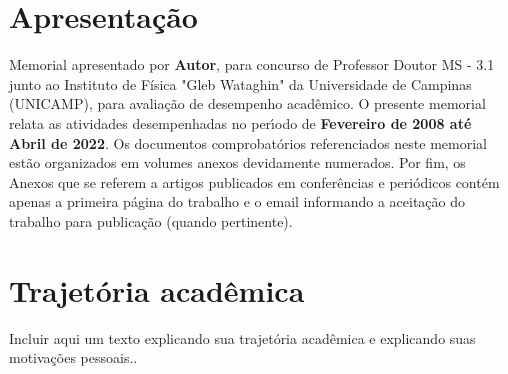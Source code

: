 \documentclass[a4paper,oneside,10pt]{article}
\newcounter{document}%
\begin{document}
\tableofcontents


\newpage
\section*{Apresenta\c{c}\~{a}o}
\vspace{0.3cm}

\begin{onehalfspace}

Memorial apresentado por \textbf{Autor}, para concurso de Professor Doutor MS - 3.1 junto ao Instituto de Física "Gleb Wataghin" da Universidade de Campinas (UNICAMP), para avalia\c{c}\~{a}o de desempenho acad\^{e}mico.
O presente memorial relata as atividades desempenhadas no per\'{\i}odo de \textbf{Fevereiro de 2008 até Abril de 2022}. Os documentos comprobat\'{o}rios referenciados neste memorial est\~{a}o organizados em volumes anexos devidamente numerados. 
Por fim, os Anexos que se referem a artigos publicados em confer\^{e}ncias e peri\'{o}dicos cont\'{e}m apenas a primeira p\'{a}gina do trabalho e o email informando a aceita\c{c}\~{a}o do trabalho para publica\c{c}\~{a}o (quando pertinente).

\end{onehalfspace}


\newpage
\section{Trajet\'{o}ria acad\^{e}mica}
\vspace{0.3cm}

\begin{onehalfspace}

Incluir aqui um texto explicando sua trajetória acadêmica e explicando suas motivações pessoais..

\end{onehalfspace}

\newpage
\end{document}
